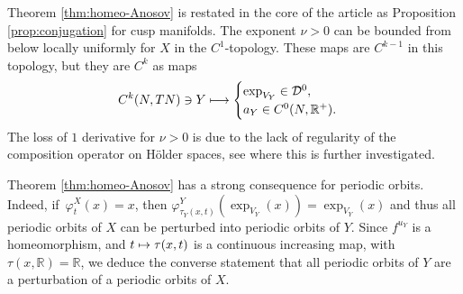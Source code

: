 \documentclass[JEP,XML,SOM,Unicode,NoFloatCountersInSection]{cedram}
\newcommand\mto{\mathchoice{\longmapsto}{\mapsto}{\mapsto}{\mapsto}}
\newcommand{\R}{\mathbb{R}}
\theoremstyle{plain}
\theoremstyle{definition}
\begin{document}
Theorem \ref{thm:homeo-Anosov} is restated in the core of the article as Proposition \ref{prop:conjugation} for cusp manifolds. The exponent $\nu > 0$ can be bounded from below locally uniformly for $X$ in the $C^1$-topology. These maps are $C^{k-1}$ in this topology, but they are $C^k$ as maps
\[
C^{k}(N,TN)\owns Y \mto \begin{cases} \exp_{V_Y} \in \mathcal{D}^0, \\ a_Y \in C^0(N,\R^+).
\end{cases}
\]
The loss of $1$ derivative for $\nu>0$ is due to the lack of regularity of the composition operator on H\"older spaces, see \cite{dlLlave-98} where this is further investigated.

Theorem \ref{thm:homeo-Anosov} has a strong consequence for periodic orbits. Indeed, if~\hbox{$\varphi^X_t(x) \!=\! x$}, then $\varphi^Y_{\tau_Y(x,t)}(\exp_{V_Y}(x))=\exp_{V_Y}(x)$ and thus all periodic orbits of $X$ can be perturbed into periodic orbits of $Y$. Since $f^{u_Y}$ is a homeomorphism, and $t\mto \tau(x, t)$ is a continuous increasing map, with $\tau(x,\R)=\R$, we deduce the converse statement that all periodic orbits of $Y$ are a perturbation of a periodic orbits of $X$.
\end{document}
